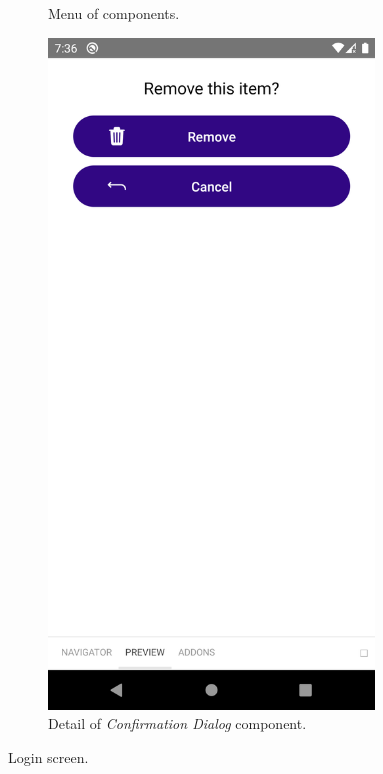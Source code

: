 \documentclass[
  digital, %
  table,   %
  oneside, %
  lof,     %
  lot,     %
]{fithesis3}
\newcommand\half{0.45}
\newcommand\subfigsize{0.95}
\begin{document}
\begin{figure}
\begin{subfigure}[t]{\half\textwidth}
      \caption{Menu of components.}
      \label{fig:storybook_rn_menu}
    \end{subfigure}%
    \begin{subfigure}[t]{\half\textwidth}
      \centering
      \includegraphics[width=\subfigsize\textwidth]{figures/other/storybook_rn_confirm_delete_component}
      \caption{Detail of \textit{Confirmation Dialog} component.}
      \label{fig:storybook_rn_confirm_delete_component}
    \end{subfigure}
    \caption{Login screen.}
\end{figure}
\label{fig:storybook_rn}
\end{document}
